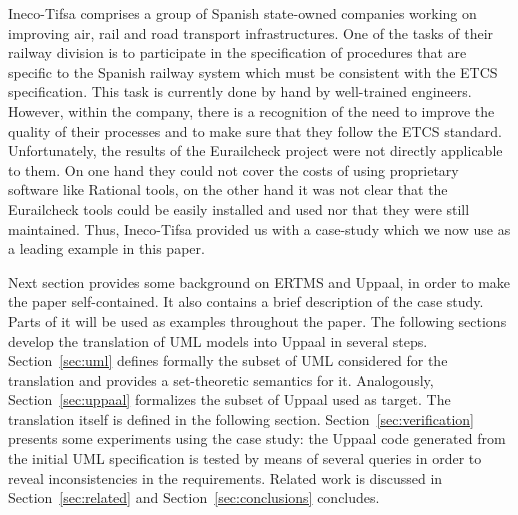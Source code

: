Ineco-Tifsa \cite{web:ineco-tifsa} comprises a group of Spanish
state-owned companies working on improving air, rail and road
transport infrastructures. One of the tasks of their railway division
is to participate in the specification of procedures that are specific
to the Spanish railway system which must be consistent with the ETCS
specification. This task is currently done by hand by well-trained
engineers. However, within the company, there is a recognition of the
need to improve the quality of their processes and to make sure that
they follow the ETCS standard. Unfortunately, the results of the
Eurailcheck project were not directly applicable to them. On one hand
they could not cover the costs of using proprietary software like
Rational tools, on the other hand it was not clear that the
Eurailcheck tools could be easily installed and used nor that they
were still maintained. Thus, Ineco-Tifsa provided us with a case-study
which we now use as a leading example in this paper.


Next section provides some background on ERTMS and Uppaal, in order to
make the paper self-contained. It also contains a brief description of
the case study. Parts of it will be used as examples throughout the
paper.
The following sections develop the translation of UML models into
Uppaal in several steps.
Section~\ref{sec:uml} defines formally the subset of UML considered for the
translation and provides a set-theoretic semantics for it.
Analogously, Section~\ref{sec:uppaal} formalizes the subset of Uppaal
used as target. 
The translation itself is defined in the following section.
Section~\ref{sec:verification} presents some experiments using the
case study: the Uppaal code generated from the initial UML
specification is tested by means of several queries in order to reveal
inconsistencies in the requirements.
Related work is discussed in Section~\ref{sec:related} and
Section~\ref{sec:conclusions} concludes.

